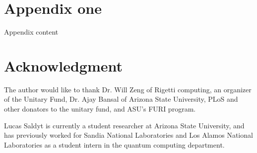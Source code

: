 \documentclass[journal]{IEEEtran}
\begin{document}
 \appendices
 \section{Appendix one}
Appendix content

\section*{Acknowledgment}

The author would like to thank Dr. Will Zeng of Rigetti computing, an organizer of the Unitary Fund, Dr. Ajay Bansal of Arizona State University, PLoS and other donators to the unitary fund, and ASU's FURI program.

\ifCLASSOPTIONcaptionsoff
  \newpage
\fi



%
%
%


\begin{IEEEbiographynophoto}{Lucas Saldyt}
    is currently a student researcher at Arizona State University, and has previously worked for Sandia National Laboratories and Los Alamos National Laboratories as a student intern in the quantum computing department.
\end{IEEEbiographynophoto}
\end{document}
